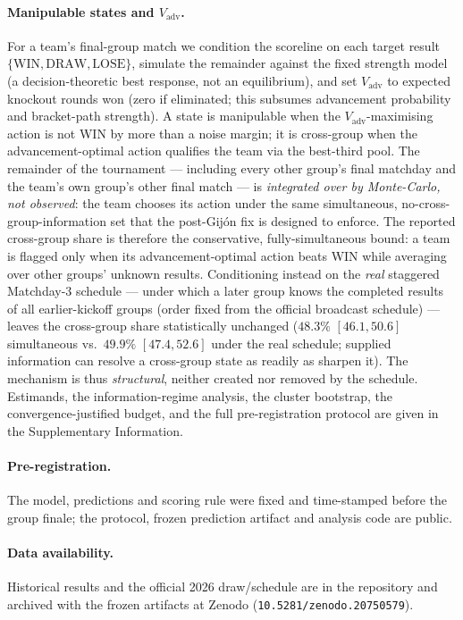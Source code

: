 \documentclass[11pt]{article}
\begin{document}
\paragraph{Manipulable states and $V_{\mathrm{adv}}$.} For a team's final-group match we condition
the scoreline on each target result $\{\mathrm{WIN},\mathrm{DRAW},\mathrm{LOSE}\}$, simulate the
remainder against the fixed strength model (a decision-theoretic best response, not an equilibrium),
and set $V_{\mathrm{adv}}$ to expected knockout rounds won (zero if eliminated; this subsumes
advancement probability and bracket-path strength). A state is manipulable when the
$V_{\mathrm{adv}}$-maximising action is not WIN by more than a noise margin; it is cross-group when
the advancement-optimal action qualifies the team via the best-third pool. The remainder of the
tournament --- including every other group's final matchday and the team's own group's other final
match --- is \emph{integrated over by Monte-Carlo, not observed}: the team chooses its action under
the same simultaneous, no-cross-group-information set that the post-Gij\'on fix is designed to
enforce. The reported cross-group share is therefore the conservative, fully-simultaneous bound: a
team is flagged only when its advancement-optimal action beats WIN while averaging over other groups'
unknown results. Conditioning instead on the \emph{real} staggered Matchday-3 schedule --- under which a
later group knows the completed results of all earlier-kickoff groups (order fixed from the official
broadcast schedule) --- leaves the cross-group share statistically unchanged ($48.3\%$ $[46.1,50.6]$
simultaneous vs.\ $49.9\%$ $[47.4,52.6]$ under the real schedule; supplied information can resolve a
cross-group state as readily as sharpen it). The mechanism is thus \emph{structural}, neither created
nor removed by the schedule. Estimands, the information-regime analysis, the cluster bootstrap, the
convergence-justified budget, and the full pre-registration protocol are given in the Supplementary
Information.
\paragraph{Pre-registration.} The model, predictions and scoring rule were fixed and time-stamped
before the group finale; the protocol, frozen prediction artifact and analysis code are public.

\paragraph{Data availability.} Historical results and the official 2026 draw/schedule are in the
repository and archived with the frozen artifacts at Zenodo (\texttt{10.5281/zenodo.20750579}).
\end{document}
